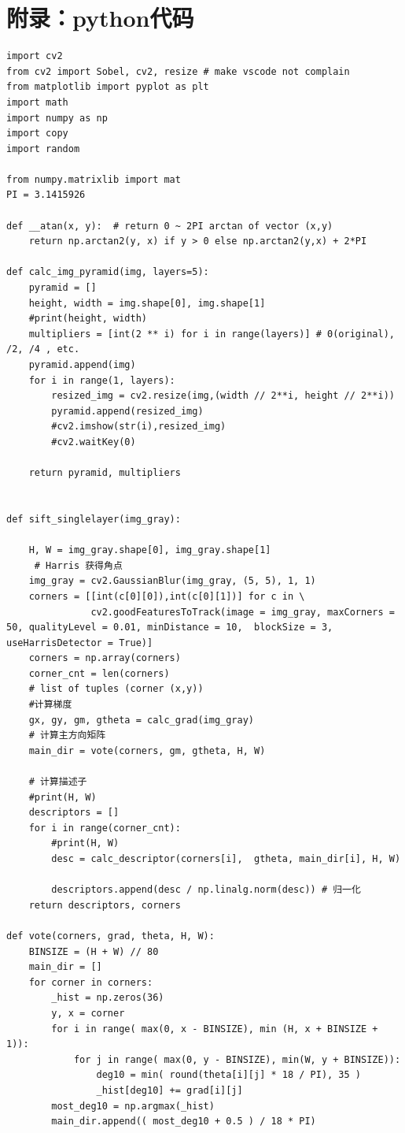 \documentclass[12pt,a4paper]{article}
\begin{document}
\section{附录：python代码}
\begin{lstlisting}[style=py]
import cv2
from cv2 import Sobel, cv2, resize # make vscode not complain
from matplotlib import pyplot as plt
import math
import numpy as np
import copy
import random

from numpy.matrixlib import mat
PI = 3.1415926

def __atan(x, y):  # return 0 ~ 2PI arctan of vector (x,y)
    return np.arctan2(y, x) if y > 0 else np.arctan2(y,x) + 2*PI

def calc_img_pyramid(img, layers=5):
    pyramid = []
    height, width = img.shape[0], img.shape[1]
    #print(height, width)
    multipliers = [int(2 ** i) for i in range(layers)] # 0(original), /2, /4 , etc.
    pyramid.append(img)
    for i in range(1, layers):
        resized_img = cv2.resize(img,(width // 2**i, height // 2**i))
        pyramid.append(resized_img)
        #cv2.imshow(str(i),resized_img)
        #cv2.waitKey(0)
        
    return pyramid, multipliers

    
def sift_singlelayer(img_gray):

    H, W = img_gray.shape[0], img_gray.shape[1]
     # Harris 获得角点
    img_gray = cv2.GaussianBlur(img_gray, (5, 5), 1, 1)
    corners = [[int(c[0][0]),int(c[0][1])] for c in \
               cv2.goodFeaturesToTrack(image = img_gray, maxCorners = 50, qualityLevel = 0.01, minDistance = 10,  blockSize = 3, useHarrisDetector = True)]
    corners = np.array(corners)
    corner_cnt = len(corners)
    # list of tuples (corner (x,y))
    #计算梯度
    gx, gy, gm, gtheta = calc_grad(img_gray)
    # 计算主方向矩阵
    main_dir = vote(corners, gm, gtheta, H, W)
    
    # 计算描述子
    #print(H, W)
    descriptors = []
    for i in range(corner_cnt):
        #print(H, W)
        desc = calc_descriptor(corners[i],  gtheta, main_dir[i], H, W)

        descriptors.append(desc / np.linalg.norm(desc)) # 归一化
    return descriptors, corners
    
def vote(corners, grad, theta, H, W):
    BINSIZE = (H + W) // 80
    main_dir = []
    for corner in corners:
        _hist = np.zeros(36)
        y, x = corner
        for i in range( max(0, x - BINSIZE), min (H, x + BINSIZE + 1)):
            for j in range( max(0, y - BINSIZE), min(W, y + BINSIZE)):
                deg10 = min( round(theta[i][j] * 18 / PI), 35 )
                _hist[deg10] += grad[i][j]
        most_deg10 = np.argmax(_hist)
        main_dir.append(( most_deg10 + 0.5 ) / 18 * PI)
    

\end{lstlisting}
\end{document}
